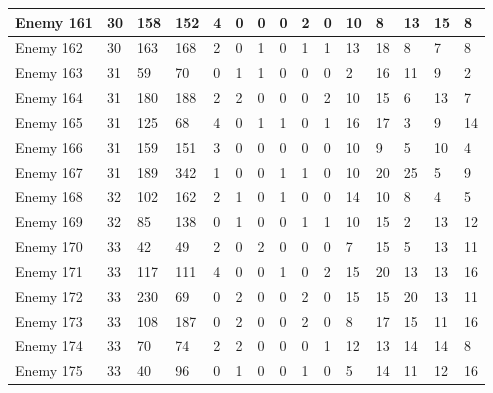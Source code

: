 \begin{sidewaystable}[!h]
{\begin{tabular}{|l|l|l|l|l|l|l|l|l|l|l|l|l|l|l|}
			Enemy 161 & 30 & 158 & 152 & 4 & 0 & 0 & 0 & 2 & 0 & 10 & 8 & 13 & 15 & 8 \\ \hline
			Enemy 162 & 30 & 163 & 168 & 2 & 0 & 1 & 0 & 1 & 1 & 13 & 18 & 8 & 7 & 8 \\ \hline
			Enemy 163 & 31 & 59 & 70 & 0 & 1 & 1 & 0 & 0 & 0 & 2 & 16 & 11 & 9 & 2 \\ \hline
			Enemy 164 & 31 & 180 & 188 & 2 & 2 & 0 & 0 & 0 & 2 & 10 & 15 & 6 & 13 & 7 \\ \hline
			Enemy 165 & 31 & 125 & 68 & 4 & 0 & 1 & 1 & 0 & 1 & 16 & 17 & 3 & 9 & 14 \\ \hline
			Enemy 166 & 31 & 159 & 151 & 3 & 0 & 0 & 0 & 0 & 0 & 10 & 9 & 5 & 10 & 4 \\ \hline
			Enemy 167 & 31 & 189 & 342 & 1 & 0 & 0 & 1 & 1 & 0 & 10 & 20 & 25 & 5 & 9 \\ \hline
			Enemy 168 & 32 & 102 & 162 & 2 & 1 & 0 & 1 & 0 & 0 & 14 & 10 & 8 & 4 & 5 \\ \hline
			Enemy 169 & 32 & 85 & 138 & 0 & 1 & 0 & 0 & 1 & 1 & 10 & 15 & 2 & 13 & 12 \\ \hline
			Enemy 170 & 33 & 42 & 49 & 2 & 0 & 2 & 0 & 0 & 0 & 7 & 15 & 5 & 13 & 11 \\ \hline
			Enemy 171 & 33 & 117 & 111 & 4 & 0 & 0 & 1 & 0 & 2 & 15 & 20 & 13 & 13 & 16 \\ \hline
			Enemy 172 & 33 & 230 & 69 & 0 & 2 & 0 & 0 & 2 & 0 & 15 & 15 & 20 & 13 & 11 \\ \hline
			Enemy 173 & 33 & 108 & 187 & 0 & 2 & 0 & 0 & 2 & 0 & 8 & 17 & 15 & 11 & 16 \\ \hline
			Enemy 174 & 33 & 70 & 74 & 2 & 2 & 0 & 0 & 0 & 1 & 12 & 13 & 14 & 14 & 8 \\ \hline
			Enemy 175 & 33 & 40 & 96 & 0 & 1 & 0 & 0 & 1 & 0 & 5 & 14 & 11 & 12 & 16 \\ \hline
		\end{tabular}%
	}
\end{sidewaystable}
\clearpage


